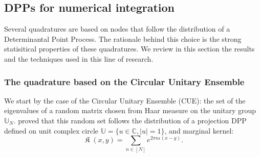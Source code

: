 \documentclass[twoside,11pt]{book}
\newtheorem{proposition}{Proposition}
\newtheorem{definition}{Definition}
\numberwithin{theorem}{chapter}
\numberwithin{definition}{chapter}
\numberwithin{proposition}{chapter}
\numberwithin{corollary}{chapter}
\numberwithin{example}{chapter}
\numberwithin{lemma}{chapter}
\DeclareMathOperator*{\KDPP}{\mathfrak{K}}
\begin{document}











\subsection{DPPs for numerical integration}
Several quadratures are based on nodes that follow the distribution of a Determinantal Point Process. The rationale behind this choice is the strong statisitical properties of these quadratures. We review in this section the results and the techniques used in this line of research. 

\subsubsection{The quadrature based on the Circular Unitary Ensemble}
We start by the case of the Circular Unitary Ensemble (CUE): the set of the eigenvalues of a random matrix chosen from Haar measure on the unitary group $\mathbb{U}_{N}$. \cite{Wey46} proved that this random set follows the distribution of a projection DPP defined on unit complex circle $\mathbb{U} = \{ u \in \mathbb{C}, |u| =1 \}$, and marginal kernel:
\begin{equation}
\KDPP(x,y) = \sum\limits_{n \in [N]} e^{2 \pi n \iota(x-y)}.
\end{equation}
\end{document}
